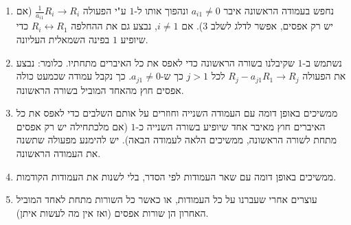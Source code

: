 \documentclass[
  hebrew,
  12pt,
  a4paper,
  oneside]{book}
\theoremstyle{definition}
\theoremstyle{remark}
\theoremstyle{plain}
\theoremstyle{remark}
\begin{document}
\begin{enumerate}
\def\labelenumi{\arabic{enumi}.}
\item
  נחפש בעמודה הראשונה איבר \(a_{i1}\neq0\) ונהפוך אותו ל-\(1\) ע"י
  הפעולה \(\frac{1}{a_{i1}}R_{i}\to R_{i}\) (אם יש רק אפסים, אפשר לדלג
  לשלב \(3\)). אם \(i\neq1\), נבצע גם את ההחלפה
  \(R_{i}\leftrightarrow R_1\) כדי שיופיע \(1\) בפינה השמאלית העליונה.
\item
  נשתמש ב-\(1\) שקיבלנו בשורה הראשונה כדי לאפס את כל האיברים מתחתיו.
  כלומר: נבצע את הפעולה \(R_{j}-a_{j1}R_1\to R_{j}\) לכל \(j>1\) כך
  ש-\(a_{j1}\neq0\). כך נקבל עמודה שכמעט כולה אפסים חוץ מהאחד המוביל
  בשורה הראשונה.
\item
  ממשיכים באופן דומה עם העמודה השנייה וחוזרים על אותם השלבים כדי לאפס את
  כל האיברים חוץ מאיבר אחד שיופיע בשורה השנייה כ-\(1\) (אם מלכתחילה יש
  רק אפסים מתחת לשורה הראשונה, ממשיכים הלאה לעמודה הבאה). יש להימנע
  מפעולה שתשנה את העמודה הראשונה.
\item
  ממשיכים באופן דומה עם שאר העמודות לפי הסדר, בלי לשנות את העמודות
  הקודמות.
\item
  עוצרים אחרי שעברנו על כל העמודות, או כאשר כל השורות מתחת לאחד המוביל
  האחרון הן שורות אפסים (ואז אין מה לעשות איתן).
\end{enumerate}
\end{document}

